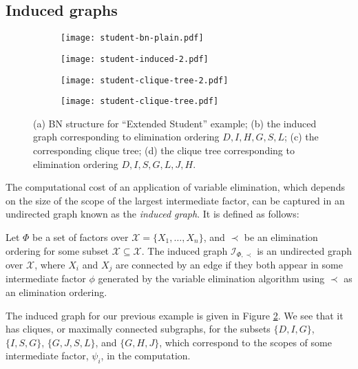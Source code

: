 \documentclass{article}
\begin{document}
 \subsection{Induced graphs}
 \label{sec:induced-graphs}

\begin{figure*}[t]
    \centering
		\begin{subfigure}[t]{0.15\textwidth}
				\centering
        \texttt{[image: student-bn-plain.pdf]}
        \caption{}
        \label{fig:student-bn-plain}
    \end{subfigure}\hfill
		\begin{subfigure}[t]{0.15\textwidth}
				\centering
        \texttt{[image: student-induced-2.pdf]}
        \caption{}
        \label{fig:student-induced-2}
    \end{subfigure}\hfill
    \begin{subfigure}[t]{0.35\textwidth}
				\centering
        \texttt{[image: student-clique-tree-2.pdf]}
        \caption{}
        \label{fig:student-clique-tree-2}
    \end{subfigure}\hfill
		\begin{subfigure}[t]{0.35\textwidth}
				\centering
        \texttt{[image: student-clique-tree.pdf]}
        \caption{}
        \label{fig:student-clique-tree}
    \end{subfigure}
    \caption[``Extended Student'' example]{(a) BN structure for ``Extended Student'' example; (b) the induced graph corresponding to elimination ordering $D,I,H,G,S,L$; (c) the corresponding clique tree; (d) the clique tree corresponding to elimination ordering $D,I,S,G,L,J,H$.}
    \label{fig:student-graphs}
\end{figure*}

 The computational cost of an application of variable elimination, which depends on the size of the scope of the largest intermediate factor, can be captured in an undirected graph known as the \emph{induced graph}.
 It is defined as follows:
 \begin{definition}
 	Let $\Phi$ be a set of factors over $\mathcal{X}=\{X_1,\ldots,X_n\}$, and $\prec$ be an elimination ordering for some subset $\mathcal{X}\subseteq\mathcal{X}$.
  The induced graph $\mathcal{I}_{\Phi,\prec}$ is an undirected graph over $\mathcal{X}$, where $X_i$ and $X_j$ are connected by an edge if they both appear in some intermediate factor $\phi$ generated by the variable elimination algorithm using $\prec$ as an elimination ordering.
 \end{definition}
 The induced graph for our previous example is given in Figure \ref{fig:student-induced-2}.
 We see that it has cliques, or maximally connected subgraphs, for the subsets  $\{D,I,G\}$, $\{I,S,G\}$, $\{G,J,S,L\}$, and $\{G,H,J\}$, which correspond to the scopes of some intermediate factor, $\psi_i$, in the computation.
\end{document}
